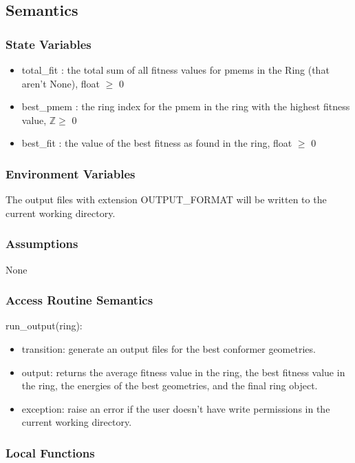\documentclass[12pt, titlepage]{article}
\begin{document}
\subsection{Semantics}

\subsubsection{State Variables}

\begin{itemize}
\item total\_fit : the total sum of all fitness values for pmems in the Ring 
(that aren't None), float $\geq$ 0
\item best\_pmem : the ring index for the pmem in the ring with the highest 
fitness value, $\mathbb{Z} \geq$ 0
\item best\_fit : the value of the best fitness as found in the ring, float 
$\geq$ 0 
\end{itemize}


\subsubsection{Environment Variables}

The output files with extension OUTPUT\_FORMAT will be written to the current 
working directory.

\subsubsection{Assumptions}

None

\subsubsection{Access Routine Semantics}

\noindent run\_output(ring):
\begin{itemize}
	\item transition: generate an output files for the best conformer 
	geometries.
	\item output: returns the average fitness value in the ring, the best 
	fitness value in the ring, the energies of the best geometries, and the 
	final ring object.
	\item exception: raise an error if the user doesn't have write permissions 
	in the current working directory.
\end{itemize}

\subsubsection{Local Functions}
\end{document}
